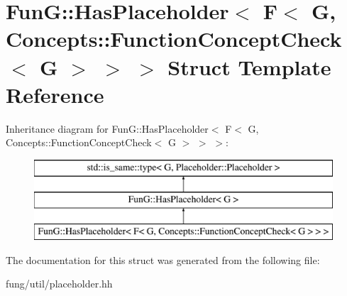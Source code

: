 \hypertarget{structFunG_1_1HasPlaceholder_3_01F_3_01G_00_01Concepts_1_1FunctionConceptCheck_3_01G_01_4_01_4_01_4}{\section{Fun\-G\-:\-:Has\-Placeholder$<$ F$<$ G, Concepts\-:\-:Function\-Concept\-Check$<$ G $>$ $>$ $>$ Struct Template Reference}
\label{structFunG_1_1HasPlaceholder_3_01F_3_01G_00_01Concepts_1_1FunctionConceptCheck_3_01G_01_4_01_4_01_4}
}
Inheritance diagram for Fun\-G\-:\-:Has\-Placeholder$<$ F$<$ G, Concepts\-:\-:Function\-Concept\-Check$<$ G $>$ $>$ $>$\-:\begin{figure}[H]
\begin{center}
\leavevmode
\includegraphics[height=3.000000cm]{structFunG_1_1HasPlaceholder_3_01F_3_01G_00_01Concepts_1_1FunctionConceptCheck_3_01G_01_4_01_4_01_4}
\end{center}
\end{figure}


The documentation for this struct was generated from the following file\-:\begin{DoxyCompactItemize}
\item 
fung/util/placeholder.\-hh\end{DoxyCompactItemize}
